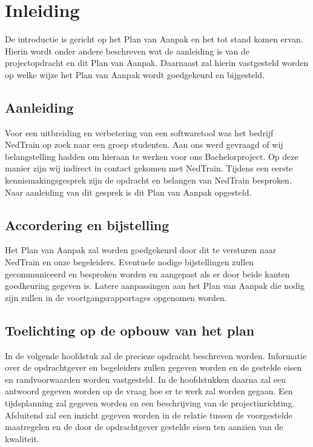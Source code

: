 \section{Inleiding}
De introductie is gericht op het Plan van Aanpak en het tot stand komen ervan. Hierin wordt onder andere beschreven wat de aanleiding is van de projectopdracht en dit Plan van Aanpak. Daarnaast zal hierin vastgesteld worden op welke wijze het Plan van Aanpak wordt goedgekeurd en bijgesteld.\\

\subsection{Aanleiding}
Voor een uitbreiding en verbetering van een softwaretool was het bedrijf NedTrain op zoek naar een groep studenten. Aan ons werd gevraagd of wij belangstelling hadden om hieraan te werken voor ons Bachelorproject. Op deze manier zijn wij indirect in contact gekomen met NedTrain. Tijdens een eerste kennismakingsgesprek zijn de opdracht en belangen van NedTrain besproken. Naar aanleiding van dit gesprek is dit Plan van Aanpak opgesteld.\\

\subsection{Accordering en bijstelling}
Het Plan van Aanpak zal worden goedgekeurd door dit te versturen naar NedTrain en onze begeleiders. Eventuele nodige bijstellingen zullen gecommuniceerd en besproken worden en aangepast als er door beide kanten goedkeuring gegeven is. Latere aanpassingen aan het Plan van Aanpak die nodig zijn zullen in de voortgangsrapportages opgenomen worden.\\

\subsection{Toelichting op de opbouw van het plan}
In de volgende hoofdstuk zal de precieze opdracht beschreven worden. Informatie over de opdrachtgever en begeleiders zullen gegeven worden en de gestelde eisen en randvoorwaarden worden vastgesteld. In de hoofdstukken daarna zal een antwoord gegeven worden op de vraag hoe er te werk zal worden gegaan. Een tijdsplanning zal gegeven worden en een beschrijving van de projectinrichting. Afsluitend zal een inzicht gegeven worden in de relatie tussen de voorgestelde maatregelen en de door de opdrachtgever gestelde eisen ten aanzien van de kwaliteit.\\